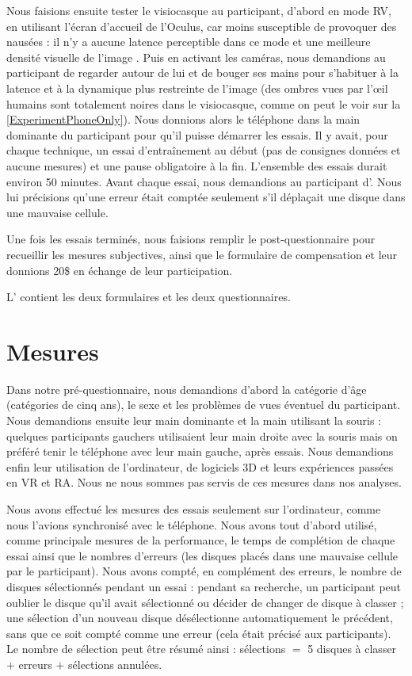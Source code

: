 Nous faisions ensuite tester le visiocasque au participant, d'abord en mode RV, en utilisant l'écran d'accueil de l'Oculus, car moins susceptible de provoquer des nausées : il n'y a aucune latence perceptible dans ce mode et une meilleure densité visuelle de l'image . Puis en activant les caméras, nous demandions au participant de regarder autour de lui et de bouger ses mains pour s'habituer à la latence et à la dynamique plus restreinte de l'image (des ombres vues par l'\oe il humains sont totalement noires dans le visiocasque, comme on peut le voir sur la \autoref{ExperimentPhoneOnly}). Nous donnions alors le téléphone dans la main dominante du participant pour qu'il puisse démarrer les essais. Il y avait, pour chaque technique, un essai d'entraînement au début (pas de consignes données et aucune mesures) et une pause obligatoire à la fin. L'ensemble des essais durait environ 50 minutes. Avant chaque essai, nous demandions au participant d'. Nous lui précisions qu'une erreur était comptée seulement s'il déplaçait une disque dans une mauvaise cellule.

Une fois les essais terminés, nous faisions remplir le post-questionnaire pour recueillir les mesures subjectives, ainsi que le formulaire de compensation et leur donnions 20\$ en échange de leur participation.

L' contient les deux formulaires et les deux questionnaires.


\section{Mesures}
\label{sec:experiment_measures}

Dans notre pré-questionnaire, nous demandions d'abord la catégorie d'âge (catégories de cinq ans), le sexe et les problèmes de vues éventuel du participant. Nous demandions ensuite leur main dominante et la main utilisant la souris : quelques participants gauchers utilisaient leur main droite avec la souris mais on préféré tenir le téléphone avec leur main gauche, après essais. Nous demandions enfin leur utilisation de l'ordinateur, de logiciels 3D et leurs expériences passées en VR et RA. Nous ne nous sommes pas servis de ces mesures dans nos analyses.

Nous avons effectué les mesures des essais seulement sur l'ordinateur, comme nous l'avions synchronisé avec le téléphone. Nous avons tout d'abord utilisé, comme principale mesures de la performance, le temps de complétion de chaque essai ainsi que le nombres d'erreurs (les disques placés dans une mauvaise cellule par le participant). Nous avons compté, en complément des erreurs, le nombre de disques sélectionnés pendant un essai : pendant sa recherche, un participant peut oublier le disque qu'il avait sélectionné ou décider de changer de disque à classer ; une sélection d'un nouveau disque désélectionne automatiquement le précédent, sans que ce soit compté comme une erreur (cela était précisé aux participants). Le nombre de sélection peut être résumé ainsi : sélections $=$ 5 disques à classer $+$ erreurs $+$ sélections annulées.

